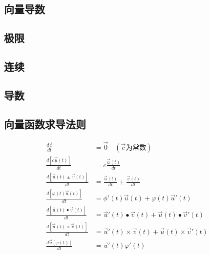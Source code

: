 \begin{center}\section{向量导数}\label{chapter_vector_derivative}\end{center}
\subsection{极限}
\subsection{连续}
\subsection{导数}
\subsection{向量函数求导法则}
\begin{align}
	\frac{d\overrightarrow{c}}{dt}&=\overrightarrow{0}\quad(\overrightarrow{c}\mbox{为常数})\\
	\frac{d\left[c\overrightarrow{u}(t)\right]}{dt}&=c\frac{\overrightarrow{u}(t)}{dt}\\
	\frac{d\left[\overrightarrow{u}(t)\pm\overrightarrow{v}(t)\right]}{dt}&=\frac{\overrightarrow{u}(t)}{dt}\pm\frac{\overrightarrow{v}(t)}{dt}\\
	\frac{d\left[\varphi(t)\overrightarrow{u}(t)\right]}{dt}&=\phi'(t)\overrightarrow{u}(t)+\varphi(t)\overrightarrow{u}'(t)\\
	\frac{d\left[\overrightarrow{u}(t)\bullet\overrightarrow{v}(t)\right]}{dt}&=\overrightarrow{u}'(t)\bullet\overrightarrow{v}(t)+\overrightarrow{u}(t)\bullet\overrightarrow{v}'(t)\\
	\frac{d\left[\overrightarrow{u}(t)\times\overrightarrow{v}(t)\right]}{dt}&=\overrightarrow{u}'(t)\times\overrightarrow{v}(t)+\overrightarrow{u}(t)\times\overrightarrow{v}'(t)\\
	\frac{d\overrightarrow{u}[\varphi(t)]}{dt}&=\overrightarrow{u}'(t)\varphi'(t)
\end{align}